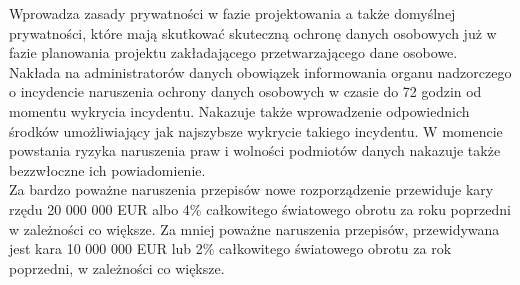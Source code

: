\documentclass[en, noamssymb]{mgr}
\begin{document}
\indent Wprowadza zasady prywatności w fazie projektowania a także domyślnej prywatności, które mają skutkować skuteczną ochronę danych osobowych już w fazie planowania projektu zakładającego przetwarzającego dane osobowe.\\
\indent Nakłada na administratorów danych obowiązek informowania organu nadzorczego o incydencie naruszenia ochrony danych osobowych w czasie do 72 godzin od momentu wykrycia incydentu. Nakazuje także wprowadzenie odpowiednich środków umożliwiający jak najszybsze wykrycie takiego incydentu. W momencie powstania ryzyka naruszenia praw i wolności podmiotów danych nakazuje także bezzwłoczne ich powiadomienie.\\
\indent Za bardzo poważne naruszenia przepisów nowe rozporządzenie przewiduje kary rzędu 20 000 000 EUR albo 4\% całkowitego światowego obrotu za roku poprzedni w zależności co większe. Za mniej poważne naruszenia przepisów, przewidywana jest kara 10 000 000 EUR lub 2\% całkowitego światowego obrotu za rok poprzedni, w zależności co większe.\\ \\
\end{document}
